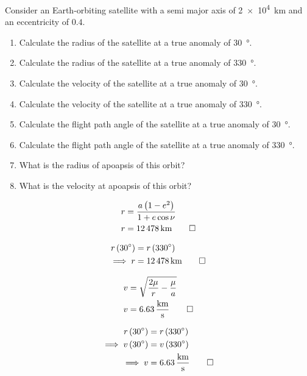 \begin{hwkProblem}{4}{}
	
	Consider an Earth-orbiting satellite with a semi major axis of \qty{2e4}{\km} and an eccentricity of \( 0.4 \).
	\begin{enumerate}
		\item Calculate the radius of the satellite at a true anomaly of \qty{30}{\degree}.
		\item Calculate the radius of the satellite at a true anomaly of \qty{330}{\degree}.
		\item Calculate the velocity of the satellite at a true anomaly of \qty{30}{\degree}.
		\item Calculate the velocity of the satellite at a true anomaly of \qty{330}{\degree}.
		\item Calculate the flight path angle of the satellite at a true anomaly of \qty{30}{\degree}.
		\item Calculate the flight path angle of the satellite at a true anomaly of \qty{330}{\degree}.
		\item What is the radius of apoapsis of this orbit?
		\item What is the velocity at apoapsis of this orbit?
	\end{enumerate}
	
	\hwkSol

	\hwkPart
	\begin{align*}
		r & = \frac{a \left( 1 - e^2 \right)}{1 + e \cos{\nu}} \\
		r & = \qty{12478}{\km} \qed
	\end{align*}

	\hwkPart
	\begin{align*}
		r \left( \qty{30}{\degree} \right) & = r \left( \qty{330}{\degree} \right) \\
		\implies r & = \qty{12478}{\km} \qed
	\end{align*}
	
	\hwkPart
	\begin{align*}
		v & = \sqrt{\frac{2\mu}{r} - \frac{\mu}{a}} \\
		v & = \qty{6.63}{\km\per\s} \qed
	\end{align*}

	\hwkPart
	\begin{align*}
		r \left( \qty{30}{\degree} \right) & = r \left( \qty{330}{\degree} \right) \\
		\implies v \left( \qty{30}{\degree} \right) & = v \left( \qty{330}{\degree} \right) \\
		\implies v & = \qty{6.63}{\km\per\s} \qed
	\end{align*}


\end{hwkProblem}
